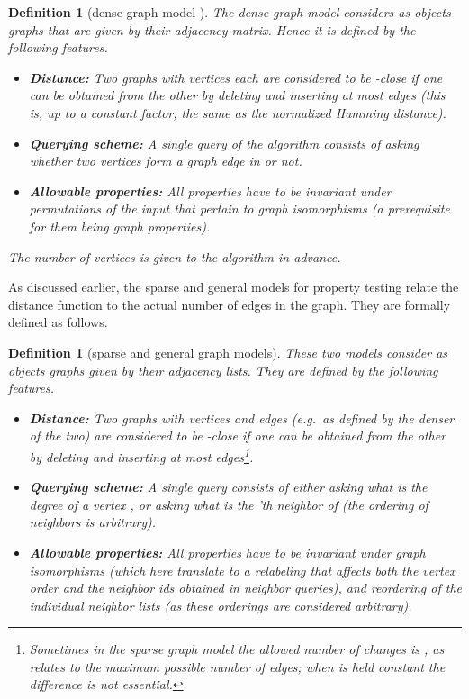 \documentclass[11pt]{article}
\newtheorem{definition}[theorem]{Definition}
\begin{document}
\begin{definition}[dense graph model \cite{GGR98}]
	The dense graph model considers as objects graphs that are given by their adjacency matrix. Hence it is defined by the following features.
	\begin{itemize}
		\item {\bf Distance:} Two graphs with  vertices each are considered to be {\em -close} if one can be obtained from the other by deleting and inserting at most  edges (this is, up to a constant factor, the same as the normalized Hamming distance).
		\item {\bf Querying scheme:} A single query of the algorithm consists of asking whether two vertices  form a graph edge in  or not.
		\item {\bf Allowable properties:} All properties have to be invariant under permutations of the input that pertain to graph isomorphisms (a prerequisite for them being graph properties).
	\end{itemize}
	The number of vertices  is given to the algorithm in advance.
\end{definition}






As discussed earlier, the sparse and general models for property testing relate the distance function to the actual number of edges in the graph. They are formally defined as follows.

\begin{definition}[sparse \cite{GoldreichR02} and general \cite{AKKR} graph models]
	These two models consider as objects graphs given by their adjacency lists. They are defined by the following features.
	\begin{itemize}
		\item {\bf Distance:} Two graphs with  vertices and  edges (e.g.\ as defined by the denser of the two) are considered to be {\em -close} if one can be obtained from the other by deleting and inserting at most  edges\footnote{Sometimes in the sparse graph model the allowed number of changes is , as relates to the maximum possible number of edges; when  is held constant the difference is not essential.}.
		\item {\bf Querying scheme:} A single query consists of either asking what is the degree of a vertex , or asking what is the 'th neighbor of  (the ordering of neighbors is arbitrary).
		\item {\bf Allowable properties:} All properties have to be invariant under graph isomorphisms (which here translate to a relabeling that affects both the vertex order and the neighbor ids obtained in neighbor queries), and reordering of the individual neighbor lists (as these orderings are considered arbitrary).
	\end{itemize}
\end{definition}
\end{document}
